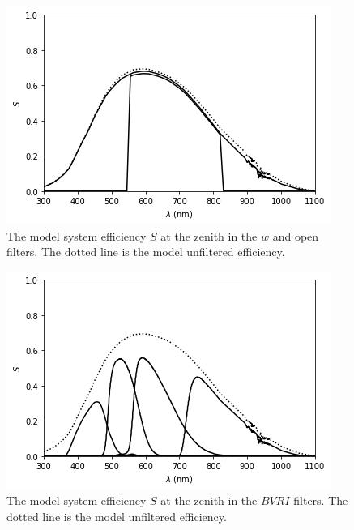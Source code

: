 \begin{figure}
\begin{center}
\includegraphics[width=0.7\linewidth]{figures/huitzi-S-w-open.png}
\medskip
\caption{The model system efficiency $S$ at the zenith in the $w$ and open filters. The dotted line is the model unfiltered efficiency.}
\end{center}
\end{figure}

\begin{figure}
\begin{center}
\includegraphics[width=0.7\linewidth]{figures/huitzi-S-JC-BVRI.png}
\medskip
\caption{The model system efficiency $S$ at the zenith in the $BVRI$ filters. The dotted line is the model unfiltered efficiency.}
\end{center}
\end{figure}

